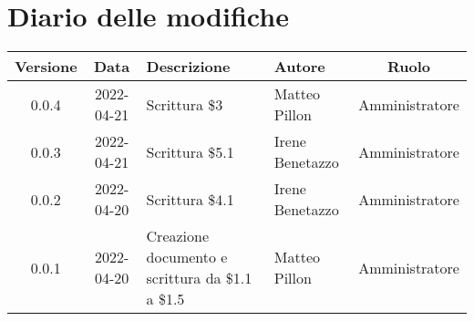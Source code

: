\section*{Diario delle modifiche}
	\begin{center}
	\renewcommand{\arraystretch}{1.8} %
	\begin{tabular}{ |c|c|m{12em}|m{7em}|c| }
	\hline
	\textbf{Versione} & \textbf{Data} & \textbf{Descrizione} &  \textbf{Autore} &  \textbf{Ruolo} \\ %
	\hline 
	0.0.4 & 2022-04-21 & Scrittura \$3 & Matteo Pillon & Amministratore\\
	\hline
	0.0.3 & 2022-04-21 & Scrittura \$5.1 & Irene Benetazzo & Amministratore\\
	\hline
	0.0.2 & 2022-04-20 & Scrittura \$4.1 & Irene Benetazzo & Amministratore\\
	\hline
    0.0.1 & 2022-04-20 & Creazione documento e scrittura da \$1.1 a \$1.5 & Matteo Pillon & Amministratore\\ %
	\hline
	\end{tabular}
	\end{center}
	\newpage